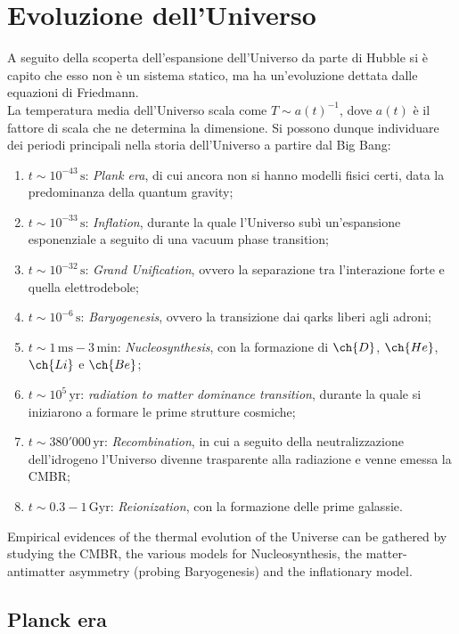 \section{Evoluzione dell'Universo}

A seguito della scoperta dell'espansione dell'Universo da parte di Hubble si è capito che esso non è un sistema statico, ma ha un'evoluzione dettata dalle equazioni di Friedmann.\\
La temperatura media dell'Universo scala come $ T \sim a(t)^{-1} $, dove $ a(t) $ è il fattore di scala che ne determina la dimensione. Si possono dunque individuare dei periodi principali nella storia dell'Universo a partire dal Big Bang:
\begin{enumerate}
	\item $ t \sim 10^{-43} \,\text{s} $: \textit{Plank era}, di cui ancora non si hanno modelli fisici certi, data la predominanza della quantum gravity;
	\item $ t \sim 10^{-33} \,\text{s} $: \textit{Inflation}, durante la quale l'Universo subì un'espansione esponenziale a seguito di una vacuum phase transition;
	\item $ t \sim 10^{-32} \,\text{s} $: \textit{Grand Unification}, ovvero la separazione tra l'interazione forte e quella elettrodebole;
	\item $ t \sim 10^{-6} \,\text{s} $: \textit{Baryogenesis}, ovvero la transizione dai qarks liberi agli adroni;
	\item $ t \sim 1\,\text{ms} - 3\,\text{min} $: \textit{Nucleosynthesis}, con la formazione di $ \ch{D} $, $ \ch{He} $, $ \ch{Li} $ e $ \ch{Be} $;
	\item $ t \sim 10^5 \,\text{yr} $: \textit{radiation to matter dominance transition}, durante la quale si iniziarono a formare le prime strutture cosmiche;
	\item $ t \sim 380'000 \,\text{yr} $: \textit{Recombination}, in cui a seguito della neutralizzazione dell'idrogeno l'Universo divenne trasparente alla radiazione e venne emessa la CMBR;
	\item $ t \sim 0.3 - 1 \,\text{Gyr} $: \textit{Reionization}, con la formazione delle prime galassie.
\end{enumerate}
Empirical evidences of the thermal evolution of the Universe can be gathered by studying the CMBR, the various models for Nucleosynthesis, the matter-antimatter asymmetry (probing Baryogenesis) and the inflationary model.

\subsection{Planck era}

